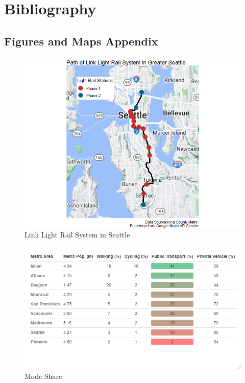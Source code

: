 \documentclass[A4paper,12pt]{article}
\begin{document}
\newpage

\section{Bibliography}
\printbibliography

\newpage

\begin{appendices}

\section{Figures and Maps Appendix}
\label{appendix:maps}

\begin{figure}[h]
\caption{Link Light Rail System in Seattle}
\label{maps:link}
\centering
\includegraphics[width=1.0\textwidth]{Maps/link_light_rail_map.png}
\end{figure}

\begin{figure}[h]
\caption{Mode Share}
\label{maps:mode}
\centering
\includegraphics[width=1.0\textwidth]{Tables/mode_share.png}
\end{figure}


\end{appendices}
\end{document}
